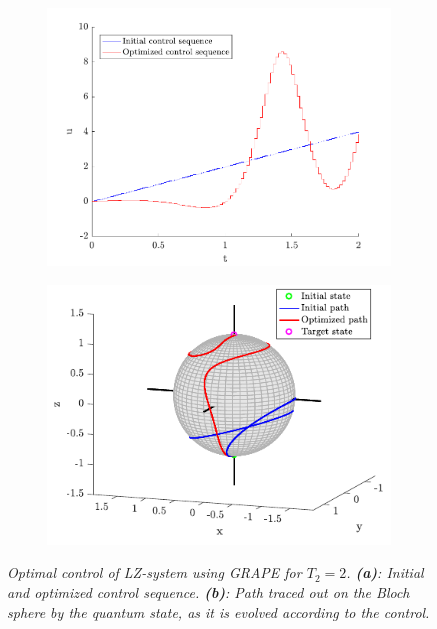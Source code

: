 \begin{figure}[h!]
\centering %
\begin{subfigure}[b]{0.48\textwidth}
	\caption{}  
  	\includegraphics[width=\textwidth]{Figures/LZcontrol2.pdf}
\end{subfigure}
\hspace{3mm}
\begin{subfigure}[b]{0.48\textwidth}
	\caption{}    
  	\includegraphics[width=\textwidth]{Figures/LZpath2.pdf}
\end{subfigure}

\caption{\textit{Optimal control of LZ-system using GRAPE for $T_2 = 2$. \textbf{(a)}: Initial and optimized control sequence. \textbf{(b)}: Path traced out on the Bloch sphere by the quantum state, as it is evolved according to the control.}}
\label{fig:LZopt2}
\end{figure}
